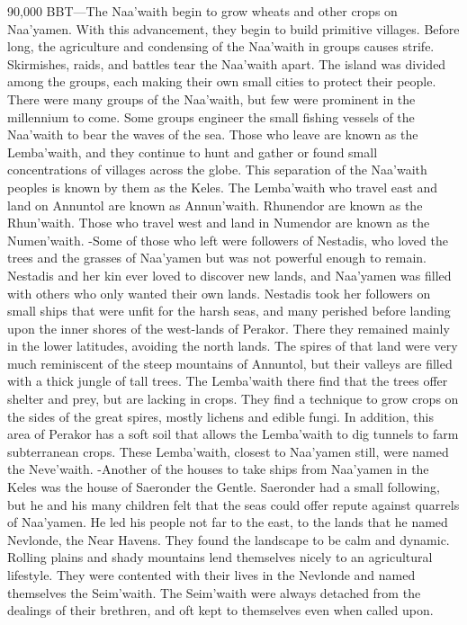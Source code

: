 \documentclass[smalldemyvopaper,11pt,twoside,onecolumn,openright,extrafontsizes]{memoir}
\begin{document}
90,000 BBT—The Naa’waith begin to grow wheats and other crops on Naa’yamen. With this advancement, they begin to build primitive villages. Before long, the agriculture and condensing of the Naa’waith in groups causes strife. Skirmishes, raids, and battles tear the Naa’waith apart. The island was divided among the groups, each making their own small cities to protect their people. There were many groups of the Naa’waith, but few were prominent in the millennium to come.
Some groups engineer the small fishing vessels of the Naa’waith to bear the waves of the sea. Those who leave are known as the Lemba'waith, and they continue to hunt and gather or found small concentrations of villages across the globe. This separation of the Naa’waith peoples is known by them as the Keles. The Lemba’waith who travel east and land on Annuntol are known as Annun’waith. Rhunendor are known as the Rhun’waith. Those who travel west and land in Numendor are known as the Numen’waith.
-Some of those who left were followers of Nestadis, who loved the trees and the grasses of Naa’yamen but was not powerful enough to remain. Nestadis and her kin ever loved to discover new lands, and Naa’yamen was filled with others who only wanted their own lands. Nestadis took her followers on small ships that were unfit for the harsh seas, and many perished before landing upon the inner shores of the west-lands of Perakor. There they remained mainly in the lower latitudes, avoiding the north lands. The spires of that land were very much reminiscent of the steep mountains of Annuntol, but their valleys are filled with a thick jungle of tall trees. The Lemba’waith there find that the trees offer shelter and prey, but are lacking in crops. They find a technique to grow crops on the sides of the great spires, mostly lichens and edible fungi. In addition, this area of Perakor has a soft soil that allows the Lemba’waith to dig tunnels to farm subterranean crops. These Lemba’waith, closest to Naa’yamen still, were named the Neve’waith.
-Another of the houses to take ships from Naa’yamen in the Keles was the house of Saeronder the Gentle. Saeronder had a small following, but he and his many children felt that the seas could offer repute against quarrels of Naa’yamen. He led his people not far to the east, to the lands that he named Nevlonde, the Near Havens. They found the landscape to be calm and dynamic. Rolling plains and shady mountains lend themselves nicely to an agricultural lifestyle. They were contented with their lives in the Nevlonde and named themselves the Seim’waith. The Seim’waith were always detached from the dealings of their brethren, and oft kept to themselves even when called upon.
\end{document}
